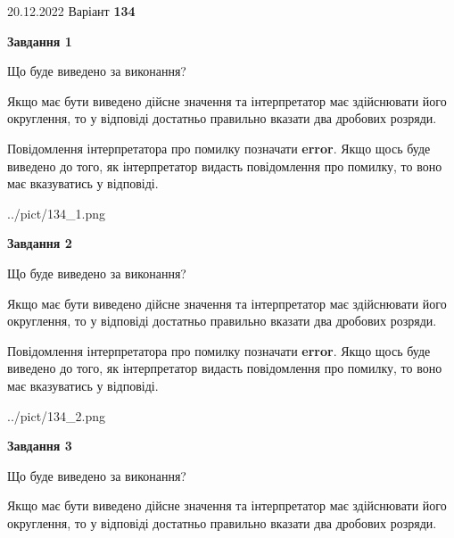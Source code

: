 \documentclass[12pt, ukrainian]{article}
\begin{document}
{20.12.2022 Варіант \No \textbf { 134 }\par}
{
\begin {Large}

{\begin {center}\textbf{Завдання 1}\end {center}}\par
Що буде виведено за виконання? \par

Якщо має бути виведено дійсне значення та інтерпретатор має здійснювати його округлення, 
то у відповіді достатньо правильно вказати два дробових розряди.

Повідомлення інтерпретатора про помилку позначати \textbf{error}.
Якщо щось буде виведено до того, як інтерпретатор видасть повідомлення про помилку, 
то воно має вказуватись у відповіді. \par

\begin{center}
	{../pict/134_1.png}
\end{center}
\newpage

{\begin {center}\textbf{Завдання 2}\end {center}}\par
Що буде виведено за виконання? \par

Якщо має бути виведено дійсне значення та інтерпретатор має здійснювати його округлення, 
то у відповіді достатньо правильно вказати два дробових розряди.

Повідомлення інтерпретатора про помилку позначати \textbf{error}.
Якщо щось буде виведено до того, як інтерпретатор видасть повідомлення про помилку, 
то воно має вказуватись у відповіді. \par

\begin{center}
	{../pict/134_2.png}
\end{center}
\newpage

{\begin {center}\textbf{Завдання 3}\end {center}}\par
Що буде виведено за виконання? \par

Якщо має бути виведено дійсне значення та інтерпретатор має здійснювати його округлення, 
то у відповіді достатньо правильно вказати два дробових розряди.


\end{Large}}
\end{document}
